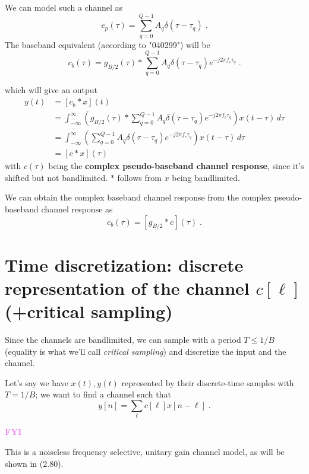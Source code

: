 \documentclass[a4paper, 12pt]{book}
\begin{document}
We can model such a channel as
\begin{equation}
c_p(\tau) = \sum_{q=0}^{Q-1} A_q \delta(\tau - \tau_q) \;. \tag{2.20}
\end{equation}
The baseband equivalent (according to \textcolor{green!60!black}{"040299"}) will be
\begin{equation}
c_b(\tau) = g_{B/2}(\tau) * \sum_{q=0}^{Q-1} A_q \delta(\tau - \tau_q) e^{-j2\pi f_c \tau_q} \;. \tag{2.21}
\end{equation}

which will give an output
\begin{align}
y(t) &= [c_b * x](t) \nonumber \\
&= \int_{-\infty}^{\infty} \left( g_{B/2}(\tau) * \sum_{q=0}^{Q-1} A_q \delta(\tau - \tau_q) e^{-j2\pi f_c \tau_q} \right) x(t-\tau) \, d\tau \tag{2.22} \\
&= \int_{-\infty}^{\infty} \left( \sum_{q=0}^{Q-1} A_q \delta(\tau - \tau_q) e^{-j2\pi f_c \tau_q} \right) x(t-\tau) \, d\tau \tag{2.23} \\
&= [c * x](\tau) \tag{2.24}
\end{align}
with $c(\tau)$ being the \textbf{complex pseudo-baseband channel response}, since it's shifted but not bandlimited.
$*$ follows from $x$ being bandlimited.

We can obtain the complex baseband channel response from the complex pseudo-baseband channel response as
\begin{equation}
c_b(\tau) = [g_{B/2} * c](\tau) \;. \tag{2.25}
\end{equation}

\section[Time discretization]{Time discretization: discrete representation of the channel $c[\ell]$ (+critical sampling)}

Since the channels are bandlimited, we can sample with a period $T \le 1/B$ (equality is what we'll call \textit{critical sampling}) and discretize the input and the channel.

Let's say we have $x(t), y(t)$ represented by their discrete-time samples with $T=1/B$; we want to find a channel such that
\begin{equation}
y[n] = \sum_{\ell} c[\ell]x[n-\ell] \;. \tag{2.27}
\end{equation}

\begin{tcolorbox}[colframe=violet!60!white, colback=white, boxrule=1pt, arc=2pt]
    \textcolor{violet}{\textbf{FYI}}

    This is a noiseless \textcolor{green!60!black}{frequency selective}, \textcolor{green!60!black}{unitary gain channel model}, as will be shown in (2.80).
\end{tcolorbox}
\end{document}
